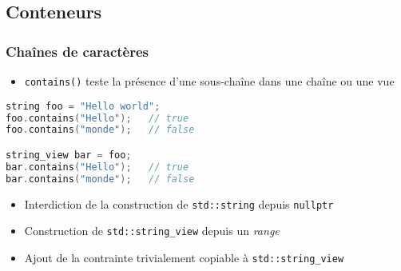 \documentclass[C++.tex]{subfiles}
\begin{document}
\subsection*{Conteneurs}
\begin{frame}[fragile]
	\frametitle{Chaînes de caractères}
	\begin{itemize}
		\item \lstinline|contains()| teste la présence d'une sous-chaîne dans une chaîne ou une vue
	\end{itemize}

	\begin{lstlisting}[language=C++]
string foo = "Hello world";
foo.contains("Hello");   // true
foo.contains("monde");   // false

string_view bar = foo;
bar.contains("Hello");   // true
bar.contains("monde");   // false\end{lstlisting}


	\begin{itemize}
		\item Interdiction de la construction de \lstinline|std::string| depuis \lstinline|nullptr|


		\item Construction de \lstinline|std::string_view| depuis un \textit{range}
		\item Ajout de la contrainte \og{}trivialement copiable\fg{} à \lstinline|std::string_view|
	\end{itemize}
\end{frame}
\end{document}
